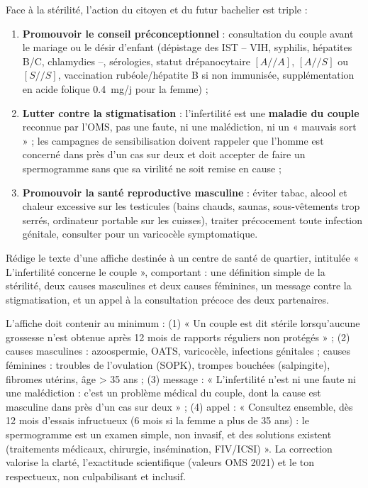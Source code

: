 \documentclass[11pt]{article}
\newcounter{popsec}
\newcounter{popsub}
\newcommand{\courssub}[1]{%
  \stepcounter{popsub}%
  \par\vspace{9pt}\noindent{\popxbold\fontsize{11.5}{13}\selectfont\color{popink}{\color{poporange}\thepopsec.\thepopsub}\hspace{6pt}#1}\par\nopagebreak\vspace{4pt}
}
\begin{document}
\courssub{Sensibilisation et prévention}

Face à la stérilité, l'action du citoyen et du futur bachelier est triple :
\begin{enumerate}
\item \textbf{Promouvoir le conseil préconceptionnel} : consultation du couple avant le mariage ou le désir d'enfant (dépistage des IST -- VIH, syphilis, hépatites B/C, chlamydies --, sérologies, statut drépanocytaire $[A//A]$, $[A//S]$ ou $[S//S]$, vaccination rubéole/hépatite B si non immunisée, supplémentation en acide folique \SI{0,4}{mg/j} pour la femme) ;
\item \textbf{Lutter contre la stigmatisation} : l'infertilité est une \textbf{maladie du couple} reconnue par l'OMS, pas une faute, ni une malédiction, ni un « mauvais sort » ; les campagnes de sensibilisation doivent rappeler que l'homme est concerné dans près d'un cas sur deux et doit accepter de faire un spermogramme sans que sa virilité ne soit remise en cause ;
\item \textbf{Promouvoir la santé reproductive masculine} : éviter tabac, alcool et chaleur excessive sur les testicules (bains chauds, saunas, sous-vêtements trop serrés, ordinateur portable sur les cuisses), traiter précocement toute infection génitale, consulter pour un varicocèle symptomatique.
\end{enumerate}

\begin{exercice}
Rédige le texte d'une affiche destinée à un centre de santé de quartier, intitulée « L'infertilité concerne le couple », comportant : une définition simple de la stérilité, deux causes masculines et deux causes féminines, un message contre la stigmatisation, et un appel à la consultation précoce des deux partenaires.
\end{exercice}

\begin{corrige}
L'affiche doit contenir au minimum : (1) « Un couple est dit stérile lorsqu'aucune grossesse n'est obtenue après 12 mois de rapports réguliers non protégés » ; (2) causes masculines : azoospermie, OATS, varicocèle, infections génitales ; causes féminines : troubles de l'ovulation (SOPK), trompes bouchées (salpingite), fibromes utérins, âge > 35 ans ; (3) message : « L'infertilité n'est ni une faute ni une malédiction : c'est un problème médical du couple, dont la cause est masculine dans près d'un cas sur deux » ; (4) appel : « Consultez ensemble, dès 12 mois d'essais infructueux (6 mois si la femme a plus de 35 ans) : le spermogramme est un examen simple, non invasif, et des solutions existent (traitements médicaux, chirurgie, insémination, FIV/ICSI) ». La correction valorise la clarté, l'exactitude scientifique (valeurs OMS 2021) et le ton respectueux, non culpabilisant et inclusif.
\end{corrige}
\end{document}
